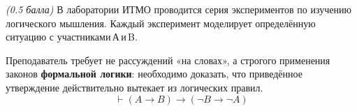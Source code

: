 \question
\textit{(0.5 балла)} В лаборатории ИТМО проводится серия экспериментов по изучению логического мышления. Каждый эксперимент моделирует определённую ситуацию с участниками А и B. 

Преподаватель требует не рассуждений «на словах», а строгого применения законов \textbf{формальной логики}: необходимо доказать, что приведённое утверждение действительно вытекает из логических правил.
$$\vdash(A \rightarrow B)\rightarrow (\neg B \rightarrow \neg A)$$
